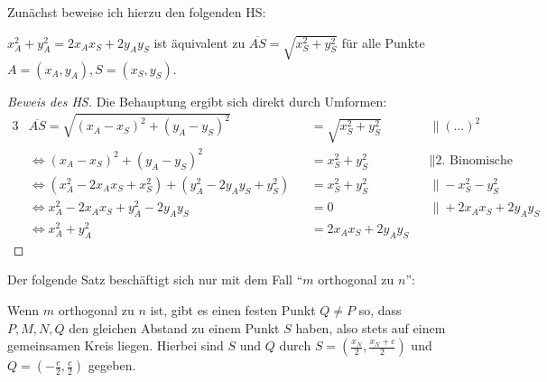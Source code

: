 Zunächst beweise ich hierzu den folgenden HS:
\begin{lem}\label{cor_hilfe}
    $x_A^2+y_A^2=2x_Ax_S+2y_Ay_S$ ist äquivalent zu $\overline{AS}=\sqrt{x_S^2+y_S^2}$ für alle 
    Punkte $A=(x_A, y_A), S=(x_S, y_S)$.
\end{lem}
\begin{proof}[Beweis des HS]
    \renewcommand{\qedsymbol}{$\square$}
    Die Behauptung ergibt sich direkt durch Umformen:
    \begin{alignat*}{3}
        &\overline{AS}=\sqrt{(x_A-x_S)^2+(y_A-y_S)^2}&&=\sqrt{x_S^2+y_S^2}\quad&&\|(\ldots)^2\\
        &\Leftrightarrow (x_A-x_S)^2+(y_A-y_S)^2&&=x_S^2+y_S^2\quad &&\|\text{2. Binomische Formel}\\
        &\Leftrightarrow (x_A^2-2x_Ax_S+x_S^2)+(y_A^2-2y_Ay_S+y_S^2)&&=x_S^2+y_S^2\quad &&\|-x_S^2-y_S^2\\
        &\Leftrightarrow x_A^2-2x_Ax_S+y_A^2-2y_Ay_S&&=0\quad &&\|+2x_Ax_S+2y_Ay_S\\
        &\Leftrightarrow x_A^2+y_A^2&&=2x_Ax_S+2y_Ay_S&&
    \end{alignat*}
\end{proof}
Der folgende Satz beschäftigt sich nur mit dem Fall "`$m$ orthogonal zu $n$"':
\begin{thm}\label{aufgabe_3}
    Wenn $m$ orthogonal zu $n$ ist, gibt es einen festen Punkt $Q\neq P$ so, dass $P, M, N, Q$ 
    den gleichen Abstand zu einem Punkt $S$ haben, also stets auf einem gemeinsamen Kreis liegen. 
    Hierbei sind $S$ und $Q$ durch $S=\left(\frac{x_N}{2}, \frac{x_N+c}{2}\right)$ und $Q=\left(-\frac{c}{2}, 
    \frac{c}{2}\right)$ gegeben.
\end{thm}
